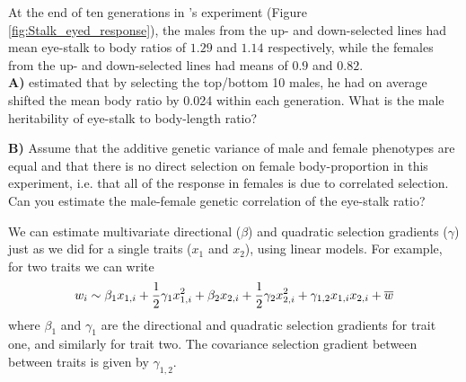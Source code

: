 \begin{question}

At the end of ten generations in \citeauthor{wilkinson:93}'s experiment (Figure
\ref{fig:Stalk_eyed_response}), the males from the up- and down-selected
lines had mean eye-stalk to body ratios of $1.29$ and $1.14$
respectively, while the females from the up- and down-selected lines
had means of $0.9$ and $0.82$. \\
{\bf A)} \citeauthor{wilkinson:93} estimated that by selecting the top/bottom 10 males, he had on average shifted the mean body ratio by 0.024 within
each generation. What is the male heritability of eye-stalk to body-length ratio?

{\bf B)} Assume that the additive genetic variance of male and female phenotypes are
equal and that there is no direct
selection on female body-proportion in this experiment, i.e. that all of
the response in females is due to correlated selection. Can you
estimate the male-female genetic correlation of the eye-stalk ratio? 
\end{question}


We can estimate multivariate directional ($\beta$) and quadratic selection
gradients ($\gamma$) just as we did for a single traits ($x_1$ and $x_2$), using linear
models. For example, for two traits we can write
\begin{equation}
w_i \sim \beta_1 x_{1,i} + \frac{1}{2} \gamma_1 x_{1,i}^2 + \beta_2 x_{2,i} + \frac{1}{2} 
\gamma_2 x_{2,i}^2  + \gamma_{1,2} x_{1,i} x_{2,i}  + \overline{w} \label{fitness_regression}
 \end{equation}
where $\beta_1$ and $\gamma_1$ are the directional and quadratic
selection gradients for trait one, and similarly for trait two. The
covariance selection gradient between between traits is given by
$\gamma_{1,2}$. 


